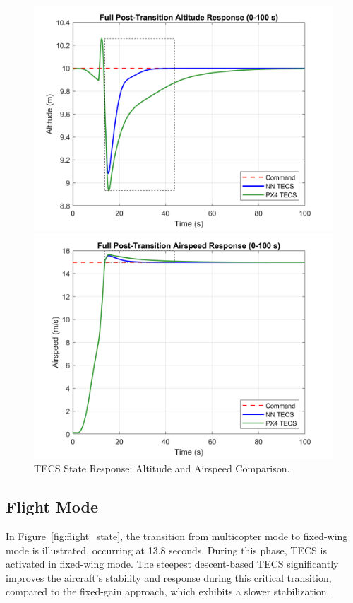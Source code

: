 \documentclass[journal,article,submit,pdftex,moreauthors]{Definitions/mdpi}
\begin{document}
\begin{figure}[H]
    \centering
    \begin{minipage}{0.45\textwidth}
        \centering
        \includegraphics[width=\linewidth]{full_altitude_plot.png}
    \end{minipage}
    \hfill
    \begin{minipage}{0.45\textwidth}
        \centering
        \includegraphics[width=\linewidth]{full_airspeed_plot.png}
    \end{minipage}
    \caption{TECS State Response: Altitude and Airspeed Comparison.}
    \label{fig:tecs_state_response}
\end{figure}

\subsection{Flight Mode}
In Figure~\ref{fig:flight_state}, the transition from multicopter mode to fixed-wing mode is illustrated, occurring at 13.8 seconds. During this phase, TECS is activated in fixed-wing mode. The steepest descent-based TECS significantly improves the aircraft's stability and response during this critical transition, compared to the fixed-gain approach, which exhibits a slower stabilization.
\end{document}
